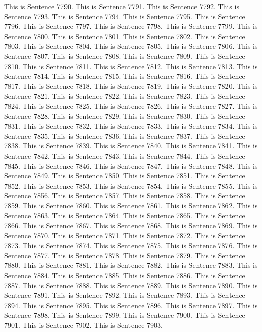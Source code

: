 \documentclass{article}
\begin{document}
This is Sentence 7790.
This is Sentence 7791.
This is Sentence 7792.
This is Sentence 7793.
This is Sentence 7794.
This is Sentence 7795.
This is Sentence 7796.
This is Sentence 7797.
This is Sentence 7798.
This is Sentence 7799.
This is Sentence 7800.
This is Sentence 7801.
This is Sentence 7802.
This is Sentence 7803.
This is Sentence 7804.
This is Sentence 7805.
This is Sentence 7806.
This is Sentence 7807.
This is Sentence 7808.
This is Sentence 7809.
This is Sentence 7810.
This is Sentence 7811.
This is Sentence 7812.
This is Sentence 7813.
This is Sentence 7814.
This is Sentence 7815.
This is Sentence 7816.
This is Sentence 7817.
This is Sentence 7818.
This is Sentence 7819.
This is Sentence 7820.
This is Sentence 7821.
This is Sentence 7822.
This is Sentence 7823.
This is Sentence 7824.
This is Sentence 7825.
This is Sentence 7826.
This is Sentence 7827.
This is Sentence 7828.
This is Sentence 7829.
This is Sentence 7830.
This is Sentence 7831.
This is Sentence 7832.
This is Sentence 7833.
This is Sentence 7834.
This is Sentence 7835.
This is Sentence 7836.
This is Sentence 7837.
This is Sentence 7838.
This is Sentence 7839.
This is Sentence 7840.
This is Sentence 7841.
This is Sentence 7842.
This is Sentence 7843.
This is Sentence 7844.
This is Sentence 7845.
This is Sentence 7846.
This is Sentence 7847.
This is Sentence 7848.
This is Sentence 7849.
This is Sentence 7850.
This is Sentence 7851.
This is Sentence 7852.
This is Sentence 7853.
This is Sentence 7854.
This is Sentence 7855.
This is Sentence 7856.
This is Sentence 7857.
This is Sentence 7858.
This is Sentence 7859.
This is Sentence 7860.
This is Sentence 7861.
This is Sentence 7862.
This is Sentence 7863.
This is Sentence 7864.
This is Sentence 7865.
This is Sentence 7866.
This is Sentence 7867.
This is Sentence 7868.
This is Sentence 7869.
This is Sentence 7870.
This is Sentence 7871.
This is Sentence 7872.
This is Sentence 7873.
This is Sentence 7874.
This is Sentence 7875.
This is Sentence 7876.
This is Sentence 7877.
This is Sentence 7878.
This is Sentence 7879.
This is Sentence 7880.
This is Sentence 7881.
This is Sentence 7882.
This is Sentence 7883.
This is Sentence 7884.
This is Sentence 7885.
This is Sentence 7886.
This is Sentence 7887.
This is Sentence 7888.
This is Sentence 7889.
This is Sentence 7890.
This is Sentence 7891.
This is Sentence 7892.
This is Sentence 7893.
This is Sentence 7894.
This is Sentence 7895.
This is Sentence 7896.
This is Sentence 7897.
This is Sentence 7898.
This is Sentence 7899.
This is Sentence 7900.
This is Sentence 7901.
This is Sentence 7902.
This is Sentence 7903.
\end{document}
